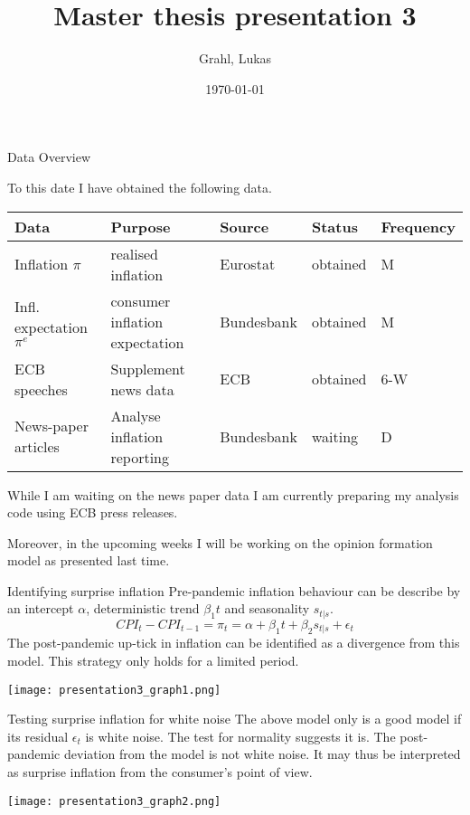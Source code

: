 \documentclass[9pt]{beamer}
\title{Master thesis presentation 3}
\author{Grahl, Lukas}
\institute{Paris 1: Panthéon Sorbonne}
\date{\today}
\begin{document}
	
	\maketitle
	
	\begin{frame}{Data Overview}
		
	To this date I have obtained the following data.
		
		\begin{center}
		\tiny{
		\begin{tabular}{l|llll}
			Data & Purpose & Source & Status & Frequency \\
			\hline
			Inflation $\pi$& realised inflation & Eurostat & obtained & M \\
			Infl. expectation $\pi^e$ & consumer inflation expectation & Bundesbank & obtained & M \\
			ECB speeches & Supplement news data & ECB & obtained & 6-W \\
			News-paper articles & Analyse inflation reporting & Bundesbank & waiting & D \\
			
		\end{tabular}
		}	
		\end{center}	
	
	While I am waiting on the news paper data I am currently preparing my analysis code using ECB press releases.
	
	Moreover, in the upcoming weeks I will be working on the opinion formation model as presented last time. 
	
	\end{frame}

	\begin{frame}{Identifying surprise inflation}
	Pre-pandemic inflation behaviour can be describe by an intercept $\alpha$, deterministic trend $\beta_1t$ and seasonality $s_{t|s}$.
	\[
		CPI_t - CPI_{t-1} = \pi_t = \alpha + \beta_1 t + \beta_2 s_{t|s} + \epsilon_t
	\]
	The post-pandemic up-tick in inflation can be identified as a divergence from this model. This strategy only holds for a limited period.
		\begin{center}
			\texttt{[image: presentation3\_graph1.png]}
		\end{center}
	\end{frame}
	
	\begin{frame}{Testing surprise inflation for white noise}
	The above model only is a good model if its residual $\epsilon_t$ is white noise. The test for normality suggests it is.
	The post-pandemic deviation from the model is not white noise. It may thus be interpreted as surprise inflation from the consumer's point of view.
		\begin{center}
			\texttt{[image: presentation3\_graph2.png]}
		\end{center}
	\end{frame}
\end{document}
